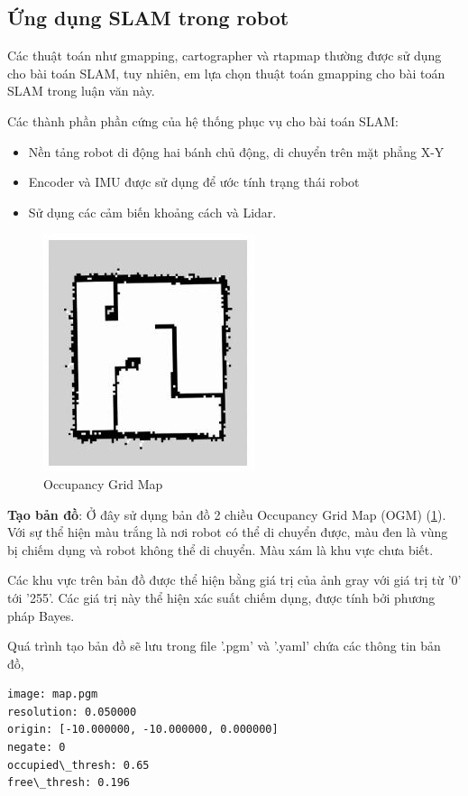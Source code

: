 \subsection{Ứng dụng SLAM trong robot}
Các thuật toán như gmapping, cartographer và rtapmap thường được sử dụng cho bài toán SLAM, tuy nhiên, em lựa chọn thuật toán gmapping cho bài toán SLAM trong luận văn này. 

Các thành phần phần cứng của hệ thống phục vụ cho bài toán SLAM:
\begin{itemize}
	\item Nền tảng robot di động hai bánh chủ động, di chuyển trên mặt phẳng X-Y
	\item Encoder và IMU được sử dụng để ước tính trạng thái robot
	\item Sử dụng các cảm biến khoảng cách và Lidar.
\end{itemize}
\begin{figure}[tph]
	\centering
	\includegraphics[width=0.4\linewidth]{chapter2/figs/OGM}
	\caption{Occupancy Grid Map}
	\label{fig:ogm}
\end{figure}

\textbf{Tạo bản đồ}: Ở đây sử dụng bản đồ 2 chiều Occupancy Grid Map (OGM)
 (\figurename{\ref{fig:ogm}}). Với sự thể hiện màu trắng là nơi robot có thể di chuyển được, màu đen là vùng bị chiếm dụng và robot không thể di chuyển. Màu xám là khu vực chưa biết. 
 
 Các khu vực trên bản đồ được thể hiện bằng giá trị của ảnh gray với giá trị từ '0' tới '255'. Các giá trị này thể hiện xác suất  chiếm dụng, được tính bởi phương pháp Bayes. 
 
 Quá trình tạo bản đồ sẽ lưu trong file '.pgm' và '.yaml' chứa các thông tin bản đồ,
 \begin{lstlisting}[numbers=none]
image: map.pgm 
resolution: 0.050000
origin: [-10.000000, -10.000000, 0.000000] 
negate: 0
occupied\_thresh: 0.65 
free\_thresh: 0.196
 \end{lstlisting}
 
